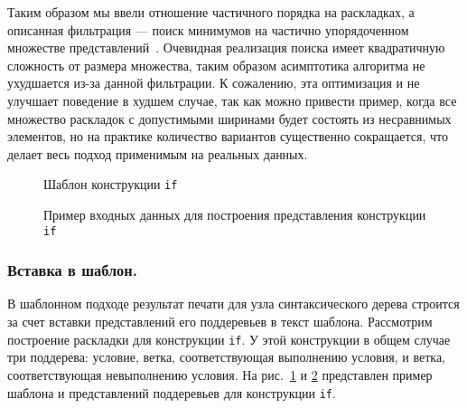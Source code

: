 Таким образом мы ввели отношение частичного порядка на раскладках, а
описанная фильтрация --- поиск минимумов на частично упорядоченном
множестве представлений~\cite{poset}.
Очевидная реализация поиска имеет квадратичную сложность от размера множества,
таким образом асимптотика алгоритма не ухудшается из-за данной фильтрации.
К сожалению, эта оптимизация и не улучшает поведение
в худшем случае, так как
можно привести пример, когда все множество раскладок с допустимыми ширинами
будет состоять из несравнимых элементов, но на практике количество вариантов
существенно сокращается, что делает весь подход применимым на реальных данных.

\begin{figure}[t]
   \centering
    \makebox[0.15\textwidth]{
      
    }
  \caption{Шаблон конструкции \lstinline{if}}
  \label{fig:ifTemplate}
\end{figure}

\begin{figure}[t]
  \subfloat[Условие]{
    \makebox[0.15\textwidth]{
      \centering
      
    }
    \label{fig:ifCond}
  }
  \quad\quad
  \quad\quad\quad
  \caption{Пример входных данных для построения представления конструкции \lstinline{if}}
  \label{fig:ifEx}
\end{figure}

\subsubsection{Вставка в шаблон.}
\label{txt:templateInsert}

В шаблонном подходе результат печати для узла синтаксического дерева строится
за счет вставки представлений его поддеревьев в текст шаблона.
Рассмотрим построение раскладки для конструкции
\lstinline{if}. У этой конструкции в общем случае три поддерева: условие,
ветка, соответствующая выполнению условия, и ветка, соответствующая
невыполнению условия.
На рис.~\ref{fig:ifTemplate} и \ref{fig:ifEx} представлен пример шаблона и представлений поддеревьев для
конструкции \lstinline{if}.

